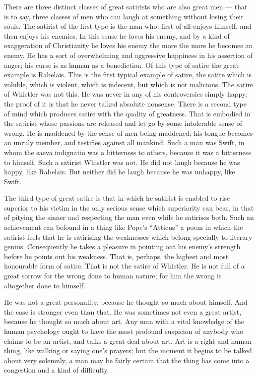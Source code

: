 There are three distinct classes of great satirists who are also great men — that is to say, three classes of men who can laugh at something without losing their souls. The satirist of the first type is the man who, first of all enjoys himself, and then enjoys his enemies. In this sense he loves his enemy, and by a kind of exaggeration of Christianity he loves his enemy the more the more he becomes an enemy. He has a sort of overwhelming and aggressive happiness in his assertion of anger; his curse is as human as a benediction. Of this type of satire the great example is Rabelais. This is the first typical example of satire, the satire which is voluble, which is violent, which is indecent, but which is not malicious. The satire of Whistler was not this. He was never in any of his controversies simply happy; the proof of it is that he never talked absolute nonsense. There is a second type of mind which produces satire with the quality of greatness. That is embodied in the satirist whose passions are released and let go by some intolerable sense of wrong. He is maddened by the sense of men being maddened; his tongue becomes an unruly member, and testifies against all mankind. Such a man was Swift, in whom the saeva indignatio was a bitterness to others, because it was a bitterness to himself. Such a satirist Whistler was not. He did not laugh because he was happy, like Rabelais. But neither did he laugh because he was unhappy, like Swift.

The third type of great satire is that in which he satirist is enabled to rise superior to his victim in the only serious sense which superiority can bear, in that of pitying the sinner and respecting the man even while he satirises both. Such an achievement can befound in a thing like Pope’s “Atticus” a poem in which the satirist feels that he is satirising the weaknesses which belong specially to literary genius. Consequently he takes a pleasure in pointing out his enemy’s strength before he points out his weakness. That is, perhaps, the highest and most honourable form of satire. That is not the satire of Whistler. He is not full of a great sorrow for the wrong done to human nature; for him the wrong is altogether done to himself.

He was not a great personality, because he thought so much about himself. And the case is stronger even than that. He was sometimes not even a great artist, because he thought so much about art. Any man with a vital knowledge of the human psychology ought to have the most profound suspicion of anybody who claims to be an artist, and talks a great deal about art. Art is a right and human thing, like walking or saying one’s prayers; but the moment it begins to be talked about very solemnly, a man may be fairly certain that the thing has come into a congestion and a kind of difficulty.

